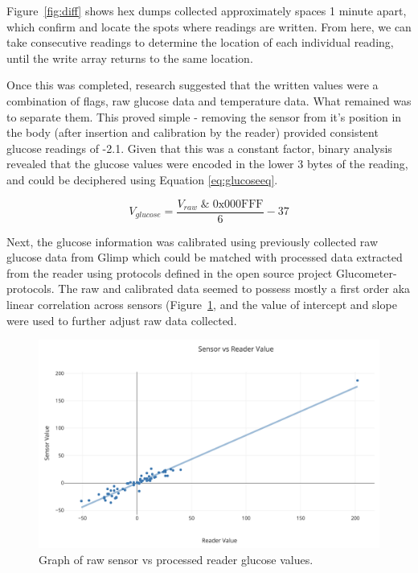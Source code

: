 Figure~\ref{fig:diff} shows hex dumps collected approximately spaces 1 minute apart, which confirm and locate the spots where readings are written. From here, we can take consecutive readings to determine the location of each individual reading, until the write array returns to the same location.

Once this was completed, research suggested that the written values were a combination of flags, raw glucose data and temperature data. What remained was to separate them. This proved simple - removing the sensor from it's position in the body (after insertion and calibration by the reader) provided consistent glucose readings of -2.1. Given that this was a constant factor, binary analysis revealed that the glucose values were encoded in the lower 3 bytes of the reading, and could be deciphered using Equation \ref{eq:glucoseeq}.

\begin{equation} \label{eq:glucoseeq}
V_{glucose} = \frac{V_{raw}\;\mathrm{\&\; 0x000FFF}}{6}-37 
\end{equation}

Next, the glucose information was calibrated using previously collected raw glucose data from Glimp\cite{software_glimp_2017} which could be matched with processed data extracted from the reader using protocols defined in the open source project Glucometer-protocols\cite{petteno_glucometer-protocols:_2017}. The raw and calibrated data seemed to possess mostly a first order aka linear correlation across sensors (Figure~\ref{fig:corr}, and the value of intercept and slope were used to further adjust raw data collected.

\begin{figure}[ht]
\centering\includegraphics[width=1.0\linewidth]{images/sensorvsreader.png}
\caption{Graph of raw sensor vs processed reader glucose values.}
\label{fig:corr}
\end{figure}

